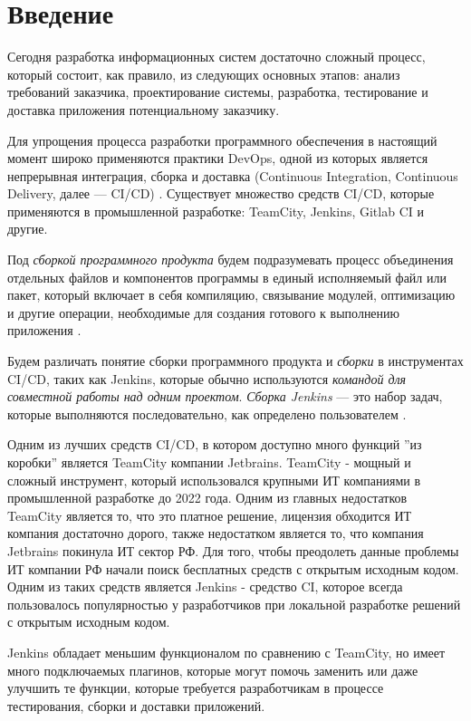 \chapter*{Введение} %

Сегодня разработка информационных систем достаточно сложный процесс, который состоит, как правило, из следующих основных этапов: анализ требований заказчика, проектирование системы, разработка, тестирование и доставка приложения потенциальному заказчику. 

Для упрощения процесса разработки программного обеспечения в настоящий момент широко применяются практики DevOps, одной из которых является непрерывная интеграция, сборка и доставка (Continuous Integration, Continuous Delivery, далее --- CI/CD) \cite{cidef}. Существует множество средств CI/CD, которые применяются в промышленной разработке: TeamCity, Jenkins, Gitlab CI и другие.

Под \textit{сборкой программного продукта} будем подразумевать процесс объединения отдельных файлов и компонентов программы в единый исполняемый файл или пакет, который включает в себя компиляцию, связывание модулей, оптимизацию и другие операции, необходимые для создания готового к выполнению приложения \cite{build}.

Будем различать понятие сборки программного продукта и \textit{сборки} в инструментах CI/CD, таких как Jenkins, которые обычно используются \textit{командой для совместной работы над одним проектом}. \textit{Сборка Jenkins} — это набор задач, которые выполняются последовательно, как определено пользователем \cite{jenkinsjob}.

Одним из лучших средств CI/CD, в котором доступно много функций ''из коробки'' является TeamCity компании Jetbrains. TeamCity - мощный и сложный инструмент, который использовался крупными ИТ компаниями в промышленной разработке до 2022 года. Одним из главных недостатков TeamCity является то, что это платное решение, лицензия обходится ИТ компания достаточно дорого, также недостатком является то, что компания Jetbrains покинула ИТ сектор РФ. Для того, чтобы преодолеть данные проблемы ИТ компании РФ начали поиск бесплатных средств с открытым исходным кодом. Одним из таких средств является Jenkins - средство CI, которое всегда пользовалось популярностью у разработчиков при локальной разработке решений с открытым исходным кодом. 

Jenkins обладает меньшим функционалом по сравнению с TeamCity, но имеет много подключаемых плагинов, которые могут помочь заменить или даже улучшить те функции, которые требуется разработчикам в процессе тестирования, сборки и доставки приложений.

